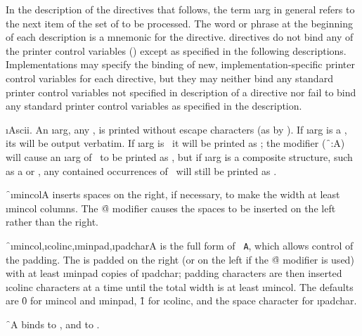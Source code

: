 

In the description of the directives that follows,
the term \i{arg} in general
refers to the next item of the set of  to be processed.
The word or phrase at the beginning of each description is a mnemonic
for the directive.
 directives do not bind any of the printer control
variables () except as specified in the following
descriptions.
   Implementations may specify the binding of new, implementation-specific 
printer control variables for each  directive, but they
    may neither bind any standard printer control variables not
    specified in description of a  
directive nor fail to bind
    any standard printer control variables as specified in the
    description.



\beginlist
{}

\i{Ascii}.  An \i{arg}, any , 
is printed without escape characters
(as by ).  If \i{arg} is a , 
its 
will be output verbatim.
If \i{arg} is \nil\ it will be printed as \nil;
the  modifier (\f{~:A}) will cause an \i{arg} of \nil\ to be printed as \empty,
but if \i{arg} is a composite structure, such as a  or ,
any contained occurrences of \nil\ will still be printed as \nil.

\f{~\i{mincol}A} inserts spaces on the right, if necessary, to make the
width at least \i{mincol} columns.  The \f{@}
modifier causes the spaces
to be inserted on the left rather than the right.

\f{~\i{mincol},\i{colinc},\i{minpad},\i{padchar}A} 
is the full form of {\tt ~A},
which allows control of the padding.
The  is padded on the right (or on the left if the
\f{@} modifier is used) with at least \i{minpad} copies
of \i{padchar}; padding characters are then inserted \i{colinc} characters
at a time until the total width is at least \i{mincol}.
The defaults are \f{0} for \i{mincol} and \i{minpad}, \f{1} for \i{colinc},
and the space character for \i{padchar}.

\f{~A} binds  to ,
and  to .


